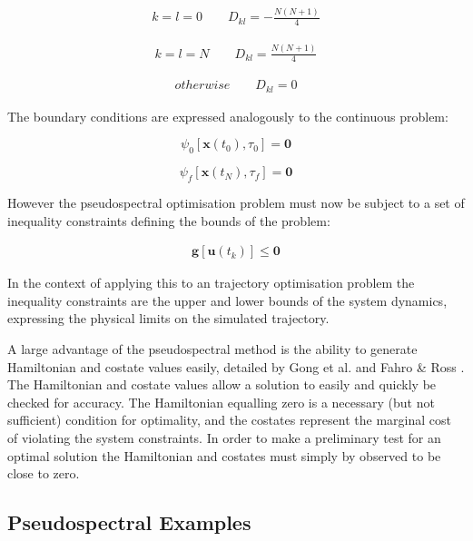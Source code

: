\begin{eqnarray}
k = l = 0\qquad
D_{kl} = - \frac{N(N+1)}{4} 
\end{eqnarray}

\begin{eqnarray}
k = l = N\qquad
D_{kl} = \frac{N(N+1)}{4} 
\end{eqnarray}

\begin{eqnarray}
otherwise \qquad
D_{kl} = 0
\end{eqnarray}

The boundary conditions are expressed analogously to the continuous problem:

\begin{equation}
\psi_0[\textbf{x}(t_0), \tau_0] = \textbf{0}
\end{equation}

\begin{equation}
\psi_f[\textbf{x}(t_N), \tau_f] = \textbf{0}
\end{equation}

However the pseudospectral optimisation problem must now be subject to a set of inequality constraints defining the bounds of the problem:

\begin{eqnarray}
\textbf{g}[\textbf{u}(t_k)] \leq \textbf{0}
\end{eqnarray}

In the context of applying this to an trajectory optimisation problem the inequality constraints are the upper and lower bounds of the system dynamics, expressing the physical limits on the simulated trajectory. 

A large advantage of the pseudospectral method is the ability to generate Hamiltonian and costate values easily, detailed by Gong et al. \cite{Gong2010} and Fahro \& Ross \cite{Fahroo2001}. The Hamiltonian and costate values allow a solution to easily and quickly be checked for accuracy.  The Hamiltonian equalling zero is a necessary (but not sufficient) condition for optimality, and the costates represent the marginal cost of violating the system constraints. In order to make a preliminary test for an optimal solution the Hamiltonian and costates must simply by observed to be close to zero. 


\subsection{Pseudospectral Examples}

